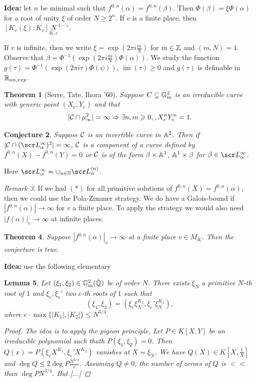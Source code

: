 \documentclass[A4paper, british, reqno]{amsart}
\theoremstyle{darkgreentheorem}
\newtheorem{thm}{Theorem}[section]
\newtheorem{lm}[thm]{Lemma}
\newtheorem{conj}[thm]{Conjecture}
\theoremstyle{darkbluedefinition}
\theoremstyle{darkredexample}
\theoremstyle{remark}
\newtheorem{rem}[thm]{Remark}
\DeclareMathOperator{\im}{im}
\newcommand{\1}{\mathbbm{1}}
\newcommand{\sub}{\subseteq}
\begin{document}
\textbf{Idea:} let $n$ be minimal such that $f^{0,n}(\alpha)=f^{0,n}(\beta)$.
Then $\Phi(\beta)=\xi \Phi(\alpha)$ for a root of unity $\xi$ of order $N\geqslant 2^{n}$.
If $v$ is a finite place, then $[K_{v}(\xi):K_{v}]\underset{K,\varepsilon} N^{1-\varepsilon}$.

If $v$ is infinite, then we write $\xi=\exp(2\pi i\frac{m}{N})$ for $m\in \mathbb{Z}$ and $(m,N)=1$.
Observe that $\beta=\Phi^{-1}(\exp(2\pi i\frac{m}{N})\Phi(\alpha))$.
We study the function $g(\tau)=\Phi^{-1}(\exp(2\pi i\tau)\Phi(\psi))$, $\im(\tau)\geqslant 0$ and $g(\tau)$ is definable in $\mathbb{R}_{an,exp}$.

\begin{thm}[Serre, Tate, Ihora '60]
    Suppose $C\sub\Gm^{2}$ is an irreducible curve with generic point $(X_{e},Y_{e})$ and that
    \[ |\mathcal{C}\cap \mu_{\infty}^{2} |=\infty \Rightarrow \exists n,m\geqslant 0,,X_{e}^{n}Y_{e}^{n}=1.\]
\end{thm}

\begin{conj}
    Suppose $\mathcal{C}$ is an invertible curve in $\mathbb{A}^{2}$.
    Then if $|\calC\cap (\L_{\alpha}^{\infty})^{2}|=\infty$, $\mathcal{C}$ is a component of a curve defined by $f^{0,n}(X)-f^{0,n}(Y)=0$ or $\mathcal{C}$ is of the form $\beta\times \mathbb{A}^{1}$, $\mathbb{A}^{1}\times \beta$ for $\beta\in\L_{\alpha}^{\infty}$.
\end{conj}

Here $\L_{\alpha}^{\infty}=\cup_{n\in\N}\L_{\alpha}^{(n)}$.

\begin{rem}
    If we had $(*)$ for all primitive solutions of $f^{0,n}(X)=f^{0,n}(\alpha)$, then we could use the Pola-Zimmer strategy.
    We do have a Galois-bound if $|f^{0,n}(\alpha)|\to \infty$ for $v$ a finite place.
    To apply the strategy we would also need $|f(\alpha)|_{v}\to \infty$ at infinite places.
\end{rem}

\begin{thm}
    Suppose $|f^{0,n}(\alpha)|_{v}\to \infty$ at a finite place $v\in M_{K}$.
    Then the conjecture is true.
\end{thm}

\textbf{Idea:} use the following elementary
\begin{lm}
    Let $(\xi_{1},\xi_{2})\in \mathbb{G}_{\mathrm{m}}^{2}(\bar{\mathbb{Q}})$ be of order $N$.
    There exists $\xi_{N}$ a primitive $N$-th root of $1$ and $\xi_{e},\xi_{e}'$ two $e$-th roots of $1$ such that
    \[ (\xi_{1},\xi_{2})=(\xi_{e}\xi_{N}^{K_{1}},\xi_{e}'\xi_{N}^{K_{2}}), \]
    where $e\cdot \max\{|K_{1}|,|K_{2}|\}\leqslant N^{3/4}$.
    \begin{proof}
	The idea is to apply the pigeon principle.
	Let $P\in K[X,Y]$ be an irreducible polynomial such thath $P(\xi_{1},\xi_{2})=0$.
	Then $Q(x)=P(\xi_{e}X^{K_{1}},\xi_{e}'X^{K_{2}})$ vanishes at $X=\xi_{N}$.
	We have $Q(X)\in K[X,\frac{1}{X}]$ and $\deg{Q}\leqslant 2\deg{P}\frac{N^{3/4}}{e}$.
	Assuming $Q\neq 0$, the number of zeroes of $Q$ is $<<$ than $\deg{P}N^{3/4}$.
	But [...]
    \end{proof}
\end{lm}
\end{document}
